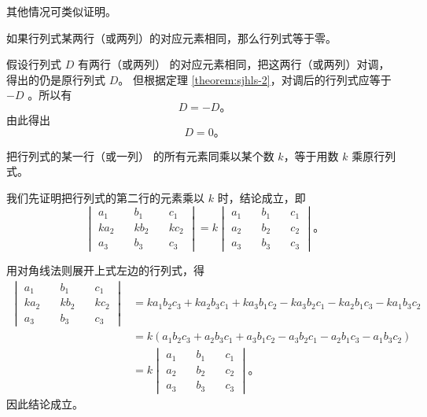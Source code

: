 其他情况可类似证明。

\begin{corollary} \label{corollary:sjhls-2-1}
    如果行列式某两行（或两列）的对应元素相同，那么行列式等于零。
\end{corollary}

\zhengming 假设行列式 $D$ 有两行（或两列） 的对应元素相同，把这两行（或两列）对调， 得出的仍是原行列式 $D$。
但根据定理 \ref{theorem:sjhls-2}，对调后的行列式应等于 $-D$ 。所以有
$$ D = -D \text{。} $$
由此得出
$$ D = 0 \text{。} $$



\begin{theorem} \label{theorem:sjhls-3}
    把行列式的某一行（或一列） 的所有元素同乘以某个数 $k$，等于用数 $k$ 乘原行列式。
\end{theorem}

\zhengming 我们先证明把行列式的第二行的元素乘以 $k$ 时，结论成立，即
$$
\begin{vmatrix*}
    a_1 \quad & b_1 \quad & c_1 \\
    ka_2 \quad & kb_2 \quad & kc_2 \\
    a_3 \quad & b_3 \quad & c_3
\end{vmatrix*}
=
k \begin{vmatrix*}
    a_1 \quad & b_1 \quad & c_1 \\
    a_2 \quad & b_2 \quad & c_2 \\
    a_3 \quad & b_3 \quad & c_3
\end{vmatrix*} \text{。}
$$

用对角线法则展开上式左边的行列式，得
\begin{align*}
    \begin{vmatrix*}
        a_1 \quad & b_1 \quad & c_1 \\
        ka_2 \quad & kb_2 \quad & kc_2 \\
        a_3 \quad & b_3 \quad & c_3
    \end{vmatrix*}
        &= ka_1b_2c_3 + ka_2b_3c_1 + ka_3b_1c_2 - ka_3b_2c_1 - ka_2b_1c_3 - ka_1b_3c_2 \\
        &= k(a_1b_2c_3 + a_2b_3c_1 + a_3b_1c_2 - a_3b_2c_1 - a_2b_1c_3 - a_1b_3c_2) \\
        &= k \begin{vmatrix*}
                a_1 \quad & b_1 \quad & c_1 \\
                a_2 \quad & b_2 \quad & c_2 \\
                a_3 \quad & b_3 \quad & c_3
            \end{vmatrix*} \text{。}
\end{align*}
因此结论成立。

